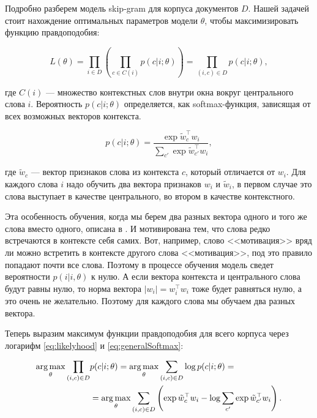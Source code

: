 \bigskip
Подробно разберем модель skip-gram для корпуса документов $D$. Нашей задачей стоит нахождение оптимальных
параметров модели $\theta$, чтобы максимизировать функцию правдоподобия:

\begin{equation} \label{eq:likelyhood}
 L(\theta)=\prod_{i\in D}\left(\prod_{c\in C(i)} p(c|i;\theta)\right) = \prod_{(i,c)\in D}p(c|i;\theta),
\end{equation}

где $C(i)$ --- множество контекстных слов внутри окна вокруг центрального слова $i$. Вероятность $p(c|i;\theta
)$ определяется, как softmax-функция, зависящая от всех возможных векторов контекста.

\begin{equation} \label{eq:generalSoftmax}
 p(c|i;\theta) = \frac{\exp{\tilde{w}_c^\top w_i}}{\sum_{c'} \exp{\tilde{w}_{c'}^\top w_i}},
\end{equation}

где $\tilde{w}_c$ --- вектор признаков слова из контекста $c$, который отличается от $w_i$. Для каждого слова
$i$ надо обучить два вектора признаков $w_i$ и $\tilde{w}_i$, в первом случае это слова выступает в качестве
центрального, во втором в качестве контекстного.

\bigskip
Эта особенность обучения, когда мы берем два разных вектора одного и того же слова вместо одного, описана в
\cite{Goldberg}. И мотивирована тем, что слова редко встречаются в контексте себя самих. Вот, например, слово
<<мотивация>> вряд ли можно встретить в контексте другого слова <<мотивация>>, под это правило попадают почти
все слова. Поэтому в процессе обучения модель сведет вероятности $p(i|i, \theta)$ к нулю. А если вектора
контекста и центрального слова будут равны нулю, то норма вектора $|w_i| = w_i^\top w_i$ тоже будет равняться
нулю, а это очень не желательно. Поэтому для каждого слова мы обучаем два разных вектора.

\bigskip
Теперь выразим максимум функции правдоподобия для всего корпуса через логарифм \ref{eq:likelyhood} и
\ref{eq:generalSoftmax}:

\begin{equation}
\begin{aligned}
 \operatorname*{arg\,max}_{\theta} \prod_{(i,c)\in D} & p(c|i;\theta) = \operatorname*{arg\,max}_{\theta} \sum_{(i,c)\in D}\log{p(c|i;\theta)} =
\\
 & = \operatorname*{arg\,max}_{\theta} \sum_{(i,c)\in D} \left(\exp{\tilde{w}_c^\top w_i} - \log{\sum_{c'}
\exp{\tilde{w}_{c'}^\top w_i}}\right).
\end{aligned}
\end{equation}

